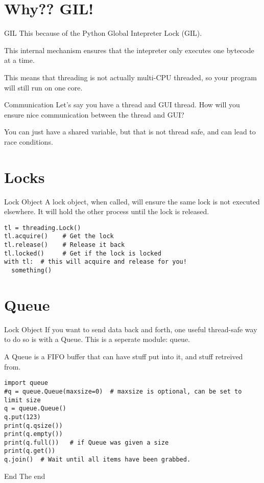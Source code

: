\section{Why?? GIL!}

\begin{frame}{GIL}
This because of the Python Global Intepreter Lock (GIL).

This internal mechanism ensures that the intepreter only executes one bytecode at a time.

This means that threading is not actually multi-CPU threaded, so your program will still run on one core.
\end{frame}

\begin{frame}{Communication}
Let's say you have a thread and GUI thread. How will you ensure nice communication between the thread and GUI?

You can just have a shared variable, but that is not thread safe, and can lead to race conditions.
\end{frame}

\section{Locks}

\begin{frame}[containsverbatim]{Lock Object}
A lock object, when called, will ensure the same lock is not executed elsewhere. It will hold the other process until the lock is released.
  \begin{verbatim}
tl = threading.Lock()
tl.acquire()    # Get the lock
tl.release()    # Release it back
tl.locked()     # Get if the lock is locked
with tl:  # this will acquire and release for you!
  something()
\end{verbatim}
\end{frame}

\section{Queue}
\begin{frame}[containsverbatim]{Lock Object}
If you want to send data back and forth, one useful thread-safe way to do so is with a Queue. This is a seperate module: queue.

A Queue is a FIFO buffer that can have stuff put into it, and stuff retreived from.
\begin{verbatim}
import queue
#q = queue.Queue(maxsize=0)  # maxsize is optional, can be set to limit size
q = queue.Queue()
q.put(123)
print(q.qsize())
print(q.empty())
print(q.full())   # if Queue was given a size
print(q.get())
q.join()  # Wait until all items have been grabbed.
\end{verbatim}
\end{frame}

\begin{frame}[standout]{End}
  The end
\end{frame}


